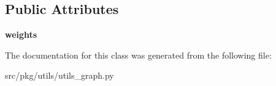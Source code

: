 \subsection*{Public Attributes}
\begin{DoxyCompactItemize}
\item 
\mbox{\label{classrnb-planning_1_1src_1_1pkg_1_1utils_1_1utils__graph_1_1_grid_with_weights_a798d5b841f4d77aa436b35dba214b2d3}} 
{\bfseries weights}
\end{DoxyCompactItemize}


The documentation for this class was generated from the following file\+:\begin{DoxyCompactItemize}
\item 
src/pkg/utils/utils\+\_\+graph.\+py\end{DoxyCompactItemize}
